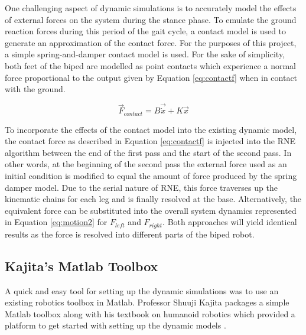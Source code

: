 One challenging aspect of dynamic simulations is to accurately model the effects of external forces on the system during the stance phase. To emulate the ground reaction forces during this period of the gait cycle, a contact model is used to generate an approximation of the contact force. For the purposes of this project, a simple spring-and-damper contact model is used. For the sake of simplicity, both feet of the biped are modelled as point contacts which experience a normal force proportional to the output given by Equation \ref{eq:contactf} when in contact with the ground. 

\begin{equation}
	\label{eq:contactf}
	\vec{F}_{contact} = B\vec{\dot{x}} + K\vec{x}
\end{equation}


To incorporate the effects of the contact model into the existing dynamic model, the contact force as described in Equation \ref{eq:contactf} is injected into the RNE algorithm between the end of the first pass and the start of the second pass. In other words, at the beginning of the second pass the external force used as an initial condition is modified to equal the amount of force produced by the spring damper model. Due to the serial nature of RNE, this force traverses up the kinematic chains for each leg and is finally resolved at the base. Alternatively, the equivalent force can be substituted into the overall system dynamics represented in Equation \ref{eq:motion2} for $F_{left}$ and $F_{right}$. Both approaches will yield identical results as the force is resolved into different parts of the biped robot. 


\subsection{Kajita's Matlab Toolbox} %
\label{sec:kajita_s_matlab_toolbox}
A quick and easy tool for setting up the dynamic simulations was to use an existing robotics toolbox in Matlab. Professor Shuuji Kajita packages a simple Matlab toolbox along with his textbook on humanoid robotics which provided a platform to get started with setting up the dynamic models \cite{kajitatxt}. 

